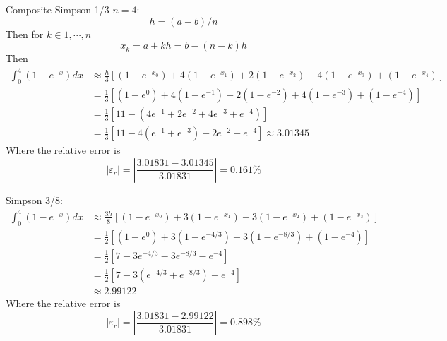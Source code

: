 \documentclass{article}
\begin{document}
\begin{solution}Composite Simpson 1/3 $n=4$:\\
\[ h = (a-b)/n \]
Then for $k\in{1,\cdots,n}$
\[ x_{k} = a+kh = b-(n-k)h \]
Then 
\begin{align*}
\int_{0}^{4} (1-e^{-x})dx &\approx \frac{h}{3} \left[ (1-e^{-x_{0}}) +4(1-e^{-x_{1}}) +2(1-e^{-x_{2}}) +4(1-e^{-x_{3}}) +(1-e^{-x_{4}}) \right]\\
&= \frac{1}{3} \left[ (1-e^{0}) +4(1-e^{-1}) +2(1-e^{-2}) +4(1-e^{-3}) +(1-e^{-4}) \right]\\
&= \frac{1}{3} \left[ 11 -(4e^{-1} +2e^{-2} +4e^{-3} +e^{-4}) \right]\\
&= \frac{1}{3} \left[ 11 -4(e^{-1} +e^{-3}) -2e^{-2} -e^{-4} \right] \approx \boxed{3.01345}
\end{align*}
Where the relative error is 
\[ \left|\varepsilon_{r}\right| = \left| \frac{3.01831 - 3.01345}{3.01831} \right| = \boxed{0.161\%} \]
\end{solution}

\begin{solution}Simpson 3/8:\\
\begin{align*}
\int_{0}^{4} (1-e^{-x})dx &\approx \frac{3h}{8} \left[ (1-e^{-x_{0}}) +3(1-e^{-x_{1}}) +3(1-e^{-x_{2}}) +(1-e^{-x_{3}}) \right]\\
&= \frac{1}{2} \left[ (1-e^{0}) +3(1-e^{-4/3}) +3(1-e^{-8/3}) +(1-e^{-4}) \right]\\
&= \frac{1}{2} \left[ 7 -3e^{-4/3} -3e^{-8/3} -e^{-4} \right]\\
&= \frac{1}{2} \left[ 7 -3(e^{-4/3} +e^{-8/3}) -e^{-4} \right]\\
&\approx \boxed{2.99122}
\end{align*}
Where the relative error is 
\[ \left|\varepsilon_{r}\right| = \left| \frac{3.01831 - 2.99122}{3.01831} \right| = \boxed{0.898\%} \]
\end{solution}
\end{document}
